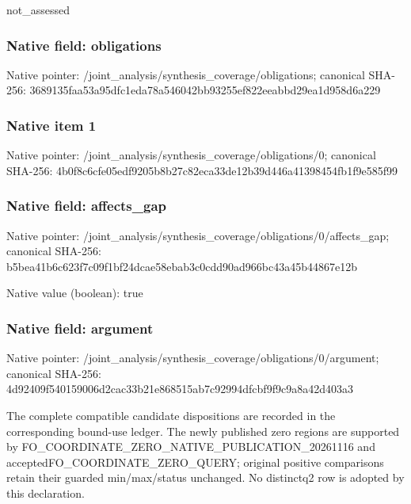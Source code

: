 \documentclass[10pt,a4paper]{article}
\begin{document}
\begingroup\raggedright\sloppy not\_\allowbreak{}assessed\par\endgroup

\subsubsection{Native field: obligations}
Native pointer: /joint\_\allowbreak{}analysis/synthesis\_\allowbreak{}coverage/obligations; canonical SHA-256: 3689135faa53a95dfc1eda78a546042bb93255ef822eeabbd29ea1d958d6a229

\subsubsection{Native item 1}
Native pointer: /joint\_\allowbreak{}analysis/synthesis\_\allowbreak{}coverage/obligations/0; canonical SHA-256: 4b0f8c6cfe05edf9205b8b27c82eca33de12b39d446a41398454fb1f9e585f99

\subsubsection{Native field: affects\_\allowbreak{}gap}
Native pointer: /joint\_\allowbreak{}analysis/synthesis\_\allowbreak{}coverage/obligations/0/affects\_\allowbreak{}gap; canonical SHA-256: b5bea41b6c623f7c09f1bf24dcae58ebab3c0cdd90ad966bc43a45b44867e12b

Native value (boolean): true

\subsubsection{Native field: argument}
Native pointer: /joint\_\allowbreak{}analysis/synthesis\_\allowbreak{}coverage/obligations/0/argument; canonical SHA-256: 4d92409f540159006d2cac33b21e868515ab7c92994dfcbf9f9c9a8a42d403a3

\begingroup\raggedright\sloppy The complete compatible candidate dispositions are recorded in the corresponding bound-use ledger. The newly published zero regions are supported by FO\_\allowbreak{}COORDINATE\_\allowbreak{}ZERO\_\allowbreak{}NATIVE\_\allowbreak{}PUBLICATION\_\allowbreak{}20261116 and acceptedFO\_\allowbreak{}COORDINATE\_\allowbreak{}ZERO\_\allowbreak{}QUERY;\allowbreak{} original positive comparisons retain their guarded min/\allowbreak{}max/\allowbreak{}status unchanged. No distinctq2 row is adopted by this declaration.\par\endgroup
\end{document}
